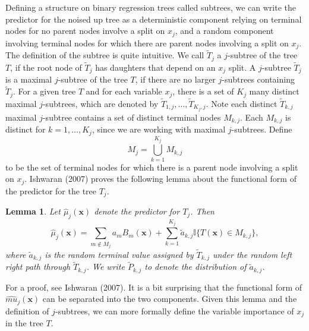 \documentclass[12pt,twoside]{reedthesis}
\newtheorem{lemma}{Lemma}[chapter]
\theoremstyle{definition}
\theoremstyle{definition}
\theoremstyle{definition}
\theoremstyle{remark}
\begin{document}
Defining a structure on binary regression trees called subtrees, we can
write the predictor for the noised up tree as a deterministic component
relying on terminal nodes for no parent nodes involve a split on
\(x_j\), and a random component involving terminal nodes for which there
are parent nodes involving a split on \(x_j\). The definition of the
subtree is quite intuitive. We call \(\tilde{T}_j\) a \(j\)-subtree of
the tree \(T\), if the root node of \(\tilde{T}_j\) has daughters that
depend on an \(x_j\) split. A \(j\)-subtree \(\tilde{T}_j\) is a maximal
\(j\)-subtree of the tree \(T\), if there are no larger \(j\)-subtrees
containing \(\tilde{T}_j\). For a given tree \(T\) and for each variable
\(x_j\), there is a set of \(K_j\) many distinct maximal \(j\)-subtrees,
which are denoted by \(\tilde{T}_{1,j},\ldots, \tilde{T}_{K_j,j}\). Note
each distinct \(\tilde{T}_{k,j}\) maximal \(j\)-subtree contains a set
of distinct terminal nodes \(M_{k,j}\). Each \(M_{k,j}\) is distinct for
\(k=1,\ldots,K_j\), since we are working with maximal \(j\)-subtrees.
Define \[M_j=\bigcup_{k=1}^{K_j} M_{k,j}\] to be the set of terminal
nodes for which there is a parent node involving a split on \(x_j\).
Ishwaran (2007) proves the following lemma about the functional form of
the predictor for the tree \(T_j\). \par
\begin{lemma}
Let $\hat{\mu}_j(\mathbf{x})$ denote the predictor for $T_j$. Then $$\hat{\mu}_j(\mathbf{x})=\sum_{m\notin M_j}a_m B_m(\mathbf{x})+\sum_{k=1}^{K_j} \tilde{a}_{k,j}\mathbb{I}\{T(\mathbf{x})\in M_{k,j}\},$$ where $\tilde{a}_{k,j}$ is the random terminal value assigned by $\tilde{T}_{k,j}$ under the random left right path through $\tilde{T}_{k,j}$. We write $\tilde{P}_{k,j}$ to denote the distribution of $\tilde{a}_{k,j}$. 
\end{lemma}
For a proof, see Ishwaran (2007). It is a bit surprising that the
functional form of \(\hat{mu}_j(\mathbf{x})\) can be separated into the
two components. Given this lemma and the definition of \(j\)-subtrees,
we can more formally define the variable importance of \(x_j\) in the
tree \(T\). \par
\end{document}
